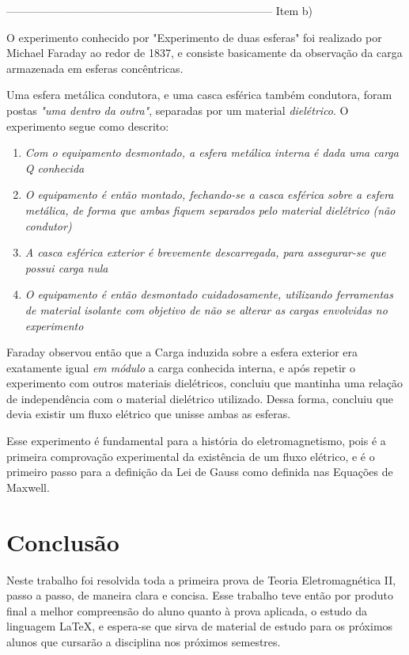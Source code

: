 \documentclass[journal,comsoc]{IEEEtran}
\begin{document}
------------------------------------------------------------------------
Item b)
\par O experimento conhecido por "Experimento de duas esferas" foi realizado por Michael Faraday ao redor de 1837, e consiste basicamente da observação da carga armazenada em esferas concêntricas.

\par Uma esfera metálica condutora, e uma casca esférica também condutora, foram postas \textit{"uma dentro da outra"}, separadas por um material \textit{dielétrico}. O experimento segue como descrito:

\begin{enumerate}
	\item{\textit{Com o equipamento desmontado, a esfera metálica interna é dada uma carga Q conhecida }}
    \item{\textit{O equipamento é então montado, fechando-se a casca esférica sobre a esfera metálica, de forma que ambas fiquem separados pelo material dielétrico (não condutor)}}
    \item{\textit{A casca esférica exterior é brevemente descarregada, para assegurar-se que possui carga nula}}
    \item{\textit{O equipamento é então desmontado cuidadosamente, utilizando ferramentas de material isolante com objetivo de não se alterar as cargas envolvidas no experimento}}
\end{enumerate}

\par Faraday observou então que a Carga induzida sobre a esfera exterior era exatamente igual \textit{em módulo} a carga conhecida interna, e após repetir o experimento com outros materiais dielétricos, concluiu que mantinha uma relação de independência com o  material dielétrico utilizado. Dessa forma, concluiu que devia existir um fluxo elétrico que unisse ambas as esferas.

\par Esse experimento é fundamental para a história do eletromagnetismo, pois é a primeira comprovação experimental da existência de um fluxo elétrico, e é o primeiro passo para a definição da Lei de Gauss como definida nas Equações de Maxwell.


\section{Conclusão}
\par Neste trabalho foi resolvida toda a primeira prova de Teoria Eletromagnética II, passo a passo, de maneira clara e concisa. Esse trabalho teve então por produto final a melhor compreensão do aluno quanto à prova aplicada, o estudo da linguagem \LaTeX, e espera-se que sirva de material de estudo para os próximos alunos que cursarão a disciplina nos próximos semestres. 
\end{document}
